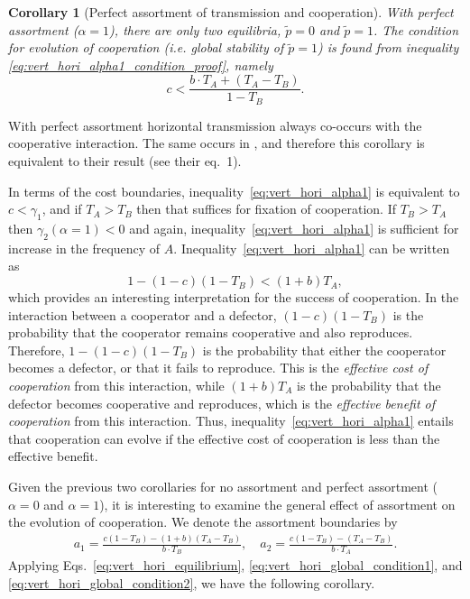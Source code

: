 \documentclass[12pt]{extarticle}
\newtheorem{corollary}{Corollary}
\begin{document}
{\begin{corollary}[Perfect assortment of transmission and cooperation]
With perfect assortment ($\alpha=1$), there are only two equilibria, $\tilde{p}=0$ and $\tilde{p}=1$.
The condition for evolution of cooperation (i.e. global stability of $\tilde{p}=1$) is found from inequality \ref{eq:vert_hori_alpha1_condition_proof}, namely
\begin{equation}\label{eq:vert_hori_alpha1}
c < \frac{b \cdot T_A + (T_A - T_B)}{1-T_B}.
\end{equation}
\end{corollary}
With perfect assortment horizontal transmission always co-occurs with the cooperative interaction. The same occurs in \citet{lewin2017microbes}, and therefore this corollary is equivalent to their result (see their eq.~1).

In terms of the cost boundaries, inequality~\ref{eq:vert_hori_alpha1} is equivalent to $c<\gamma_1$, and if $T_A>T_B$ then that suffices for fixation of cooperation. If $T_B>T_A$ then $\gamma_2(\alpha=1)<0$ and again, inequality~\ref{eq:vert_hori_alpha1} is sufficient for increase in the frequency of $A$.
Inequality~\ref{eq:vert_hori_alpha1} can be written as
\begin{equation} \label{eq:vert_hori_alpha1_effective}
1 - (1-c)(1-T_B) < (1+b) T_A ,
\end{equation}
which provides an interesting interpretation for the success of cooperation. 
In the interaction between a cooperator and a defector, $(1-c)(1-T_B)$ is the probability that the cooperator remains cooperative and also reproduces. 
Therefore, $1 - (1-c)(1-T_B)$ is the probability that either the cooperator becomes a defector, or that it fails to reproduce.
This is the \emph{effective cost of cooperation} from this interaction, while $(1+b) T_A$ is the probability that the defector becomes cooperative and reproduces, which is the \emph{effective benefit of cooperation} from this interaction.
Thus, inequality~\ref{eq:vert_hori_alpha1} entails that cooperation can evolve if the effective cost of cooperation is less than the effective benefit.

Given the previous two corollaries for no assortment and perfect assortment ($\alpha=0$ and $\alpha=1$), it is interesting to examine the general effect of assortment on the evolution of cooperation.
We denote the assortment boundaries by
\begin{equation}\begin{aligned}\label{eq:boundries_assortative_meeting}
  a_1 = \frac{c(1-T_B)-(1+b)(T_A-T_B)}{b\cdot T_B}, \quad
  a_2 = \frac{c(1-T_B)-(T_A-T_B)}{b\cdot T_A}.
\end{aligned}\end{equation}
Applying Eqs.~\ref{eq:vert_hori_equilibrium}, \ref{eq:vert_hori_global_condition1}, and \ref{eq:vert_hori_global_condition2}, we have the following corollary.
\\

}
\end{document}
